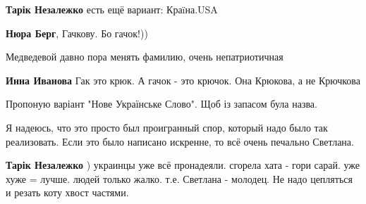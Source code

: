 \begin{itemize}
\begin{itemize}
\textbf{Тарік Незалежко} есть ещё вариант: Краïна.USA

 
\textbf{Нюра Берг}, Гачкову. Бо гачок!))

 
Медведевой давно пора менять фамилию, очень непатриотичная

 

\textbf{Инна Иванова} Гак это крюк. А гачок - это крючок. Она Крюкова, а не Крючкова

 
Пропоную варіант "Нове Українське Слово". Щоб із запасом була назва.
\end{itemize}

 

Я надеюсь, что это просто был проигранный спор, который надо было так
реализовать. Если это было написано искренне, то всё очень печально Светлана.

\begin{itemize}
 
\textbf{Тарік Незалежко} ) украинцы уже всё пронадеяли.
сгорела хата - гори сарай. уже хуже = лучше. людей только жалко.
т.е. Светлана - молодец. Не надо цепляться и резать коту хвост частями.


\end{itemize}
\end{itemize}

